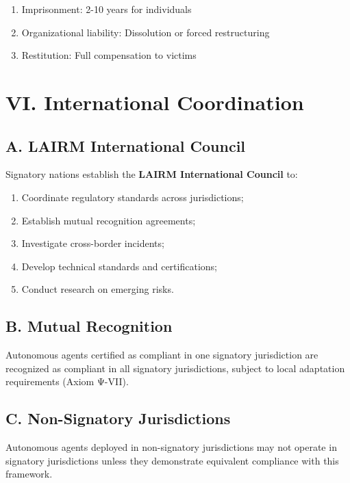 \begin{enumerate}[leftmargin=1.5cm]
    \item Imprisonment: 2-10 years for individuals
    \item Organizational liability: Dissolution or forced restructuring
    \item Restitution: Full compensation to victims
\end{enumerate}

\vspace{0.5cm}

\section*{VI. International Coordination}

\subsection*{A. LAIRM International Council}

Signatory nations establish the \textbf{LAIRM International Council} to:

\begin{enumerate}[leftmargin=1.5cm]
    \item Coordinate regulatory standards across jurisdictions;
    \item Establish mutual recognition agreements;
    \item Investigate cross-border incidents;
    \item Develop technical standards and certifications;
    \item Conduct research on emerging risks.
\end{enumerate}

\subsection*{B. Mutual Recognition}

Autonomous agents certified as compliant in one signatory jurisdiction are recognized as compliant in all signatory jurisdictions, subject to local adaptation requirements (Axiom Ψ-VII).

\subsection*{C. Non-Signatory Jurisdictions}

Autonomous agents deployed in non-signatory jurisdictions may not operate in signatory jurisdictions unless they demonstrate equivalent compliance with this framework.

